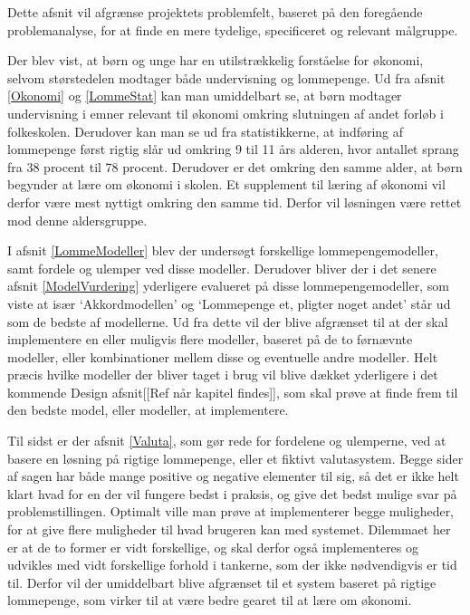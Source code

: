 Dette afsnit vil afgrænse projektets problemfelt, baseret på den foregående problemanalyse, for at finde en mere tydelige, specificeret og relevant målgruppe.

Der blev vist, at børn og unge har en utilstrækkelig forståelse for økonomi, selvom størstedelen modtager både undervisning og lommepenge. Ud fra afsnit \ref{Okonomi}  og \ref{LommeStat}  kan man umiddelbart se, at børn modtager undervisning i emner relevant til økonomi omkring slutningen af andet forløb i folkeskolen. Derudover kan man se ud fra statistikkerne, at indføring af lommepenge først rigtig slår ud omkring 9 til 11 års alderen, hvor antallet sprang fra 38 procent til 78 procent. Derudover er det omkring den samme alder, at børn begynder at lære om økonomi i skolen. Et supplement til læring af økonomi vil derfor være mest nyttigt omkring den samme tid. Derfor vil løsningen være rettet mod denne aldersgruppe.

I afsnit \ref{LommeModeller} blev der undersøgt forskellige lommepengemodeller, samt fordele og ulemper ved disse modeller. Derudover bliver der i det senere afsnit \ref{ModelVurdering} yderligere evalueret på disse lommepengemodeller, som viste at især ‘Akkordmodellen’ og ‘Lommepenge et, pligter noget andet’ står ud som de bedste af modellerne. Ud fra dette vil der blive afgrænset til at der skal implementere en eller muligvis flere modeller, baseret på de to førnævnte modeller, eller kombinationer mellem disse og eventuelle andre modeller. Helt præcis hvilke modeller der bliver taget i brug vil blive dækket yderligere i det kommende Design afsnit[[Ref når kapitel findes]], som skal prøve at finde frem til den bedste model, eller modeller, at implementere.

Til sidst er der afsnit \ref{Valuta}, som gør rede for fordelene og ulemperne, ved at basere en løsning på rigtige lommepenge, eller et fiktivt valutasystem. Begge sider af sagen har både mange positive og negative elementer til sig, så det er ikke helt klart hvad for en der vil fungere bedst i praksis, og give det bedst mulige svar på problemstillingen. Optimalt ville man prøve at implementerer begge muligheder, for at give flere muligheder til hvad brugeren kan med systemet. Dilemmaet her er at de to former er vidt forskellige, og skal derfor også implementeres og udvikles med vidt forskellige forhold i tankerne, som der ikke nødvendigvis er tid til. Derfor vil der umiddelbart blive afgrænset til et system baseret på rigtige lommepenge, som virker til at være bedre gearet til at lære om økonomi.